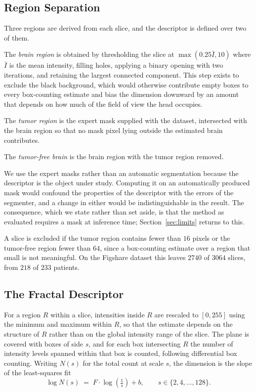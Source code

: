 \documentclass[journal]{IEEEtran}
\begin{document}
\subsection{Region Separation}
Three regions are derived from each slice, and the descriptor is defined over
two of them.

The \emph{brain region} is obtained by thresholding the slice at
$\max(0.25\bar{I}, 10)$ where $\bar{I}$ is the mean intensity, filling holes,
applying a binary opening with two iterations, and retaining the largest
connected component. This step exists to exclude the black background, which
would otherwise contribute empty boxes to every box-counting estimate and bias
the dimension downward by an amount that depends on how much of the field of view
the head occupies.

The \emph{tumor region} is the expert mask supplied with the dataset,
intersected with the brain region so that no mask pixel lying outside the
estimated brain contributes.

The \emph{tumor-free brain} is the brain region with the tumor region removed.

We use the expert masks rather than an automatic segmentation because the
descriptor is the object under study. Computing it on an automatically produced
mask would confound the properties of the descriptor with the errors of the
segmenter, and a change in either would be indistinguishable in the result. The
consequence, which we state rather than set aside, is that the method as
evaluated requires a mask at inference time; Section~\ref{sec:limits} returns to
this.

A slice is excluded if the tumor region contains fewer than $16$ pixels or the
tumor-free region fewer than $64$, since a box-counting estimate over a region
that small is not meaningful. On the Figshare dataset this leaves $2740$ of
$3064$ slices, from $218$ of $233$ patients.

\subsection{The Fractal Descriptor}
For a region $R$ within a slice, intensities inside $R$ are rescaled to
$[0,255]$ using the minimum and maximum within $R$, so that the estimate depends
on the structure of $R$ rather than on the global intensity range of the slice.
The plane is covered with boxes of side $s$, and for each box intersecting $R$
the number of intensity levels spanned within that box is counted, following
differential box counting. Writing $N(s)$ for the total count at scale $s$, the
dimension is the slope of the least-squares fit
\begin{equation}
\log N(s) \;=\; F \cdot \log\left(\tfrac{1}{s}\right) + b ,
\qquad s \in \{2, 4, \ldots, 128\}.
\label{eq:fd}
\end{equation}
\end{document}

